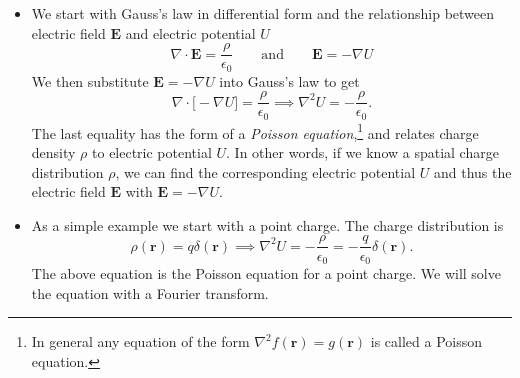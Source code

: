 \documentclass[11pt, a4paper]{article}
\newcommand{\eqtext}[1]{\qquad \text{#1} \qquad}
\renewcommand{\vec}[1]{\bm{#1}} %
\renewcommand{\r}{\vec{r}}
\newcommand{\E}{\vec{E}}  %
\newcommand{\ee}{\epsilon_{0}}  %
\renewcommand{\div}{\nabla \cdot}
\renewcommand{\grad}{\nabla}
\begin{document}
\begin{itemize}
	\item We start with Gauss's law in differential form and the relationship between electric field $ \E $ and electric potential $ U $
	\begin{equation*}
		\div \vec{E} = \frac{\rho}{\ee} \eqtext{and} \vec{E} = - \grad U
	\end{equation*}
	We then substitute $ \E = - \grad U $ into Gauss's law to get
	\begin{equation*}
		\div \big[-\grad U\big] = \frac{\rho}{\ee} \implies \nabla^{2}U = -\frac{\rho}{\ee}.
	\end{equation*}
	The last equality has the form of a \textit{Poisson equation},\footnote{In general any equation of the form $ \nabla^{2}f(\r) = g(\r) $ is called a Poisson equation.} and relates charge density $ \rho $ to electric potential $ U $. In other words, if we know a spatial charge distribution $ \rho $, we can find the corresponding electric potential $ U $ and thus the electric field $ \vec{E} $ with $ \E = - \grad U $.
	
	\item As a simple example we start with a point charge. The charge distribution is
	\begin{equation*}
		\rho(\vec{r}) = q \delta(\vec{r}) \implies \nabla^{2}U = -\frac{\rho}{\ee} = - \frac{q}{\ee}\delta(\r).
	\end{equation*}
	The above equation is the Poisson equation for a point charge. We will solve the equation with a Fourier transform.
	

\end{itemize}
\end{document}
